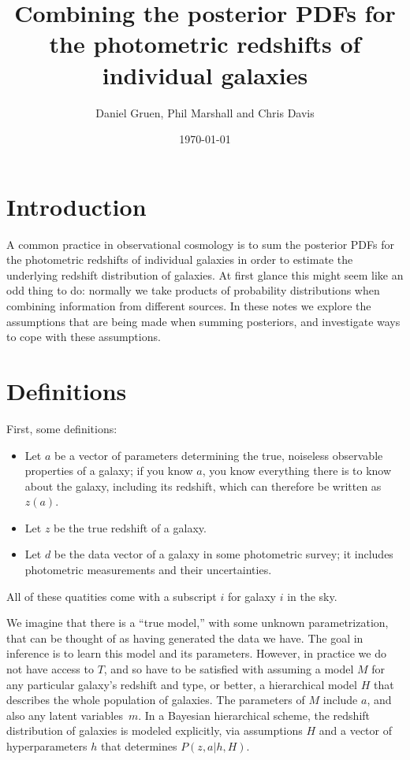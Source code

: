 \documentclass[11pt]{amsart}
\title{Combining the posterior PDFs for the photometric redshifts of individual galaxies}
\author{Daniel Gruen, Phil Marshall and Chris Davis}
\date{\today}
\begin{document}
\maketitle

\section{Introduction}

A common practice in observational cosmology is to sum the posterior
PDFs for the photometric redshifts of individual galaxies in order to
estimate the underlying redshift distribution of galaxies.  At first
glance this might seem like an odd thing to do: normally we take
products of probability distributions when combining information from
different sources. In these notes we explore the assumptions that are
being made when summing posteriors, and investigate ways to cope with
these assumptions.

\section{Definitions}

First, some definitions:
\begin{itemize}
\item Let $a$ be a vector of parameters determining the true, noiseless
observable properties of a galaxy; if you know $a$, you know everything
there is to know about the galaxy, including its redshift, which can therefore be written as $z(a)$.
\item Let $z$ be the true redshift of a galaxy.
\item Let $d$ be the data vector of a galaxy in some photometric survey;
it includes photometric measurements and their uncertainties.
\end{itemize}
All of these quatities come with a subscript $i$ for galaxy $i$ in the sky.

We imagine that there is a ``true model,'' with some unknown
parametrization, that can be thought of as having generated the data we
have. The goal in inference is to learn this model and its parameters.
However, in practice we do not have access to $T$, and so have to be
satisfied with assuming a model $M$ for any particular galaxy's redshift
and type, or better, a hierarchical model $H$ that describes the whole
population of galaxies. The parameters of $M$ include $a$, and also any
latent variables~$m$.  In a Bayesian hierarchical scheme, the redshift
distribution of galaxies is modeled explicitly, via assumptions $H$ and
a vector of hyperparameters $h$ that determines $P(z,a|h,H)$.
\end{document}
